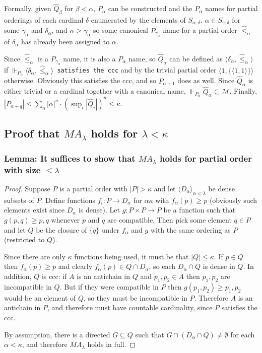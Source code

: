 \documentclass[12pt]{article}
\begin{document}
Formally, given $\hat{Q}_\beta$ for $\beta<\alpha$, $P_\alpha$ can be constructed and the $P_\alpha$ names for partial orderings of each cardinal $\delta$ enumerated by the elements of $S_{\alpha,\delta}$.  $\alpha\in S_{\gamma,\delta}$ for some $\gamma_\alpha$ and $\delta_\alpha$, and $\alpha\geq\gamma_\alpha$ so some canonical $P_{\gamma_\alpha}$ name for a partial order $\hat{\leq}_\alpha$ of $\delta_\alpha$ has already been assigned to $\alpha$.

Since $\hat{\leq}_\alpha$ is a $P_{\gamma_\alpha}$ name, it is also a $P_\alpha$ name, so $\hat{Q}_\alpha$ can be defined as $\langle\delta_\alpha,\hat{\leq}_\alpha\rangle$ if $\Vdash_{P_\alpha} \langle \delta_\alpha,\hat{\leq}_\alpha\rangle$\texttt{ satisfies the ccc} and by the trivial partial order $\langle 1,\{\langle 1,1\rangle\}\rangle$ otherwise.  Obviously this satisfies the ccc, and so $P_{\alpha+1}$ does as well.  Since $\hat{Q}_\alpha$ is either trivial or a cardinal together with a canonical name, $\Vdash_{P_\alpha}\hat{Q}_\alpha\subseteq\mathcal{M}$.  Finally, $|P_{\alpha+q}|\leq\sum_n|\alpha|^n\cdot(\operatorname{sup}_i|\hat{Q}_i|)^n\leq\kappa$.

\subsection*{Proof that $MA_\lambda$ holds for $\lambda<\kappa$}

\subsubsection*{Lemma: It suffices to show that $MA_\lambda$ holds for partial order with size $\leq\lambda$}
\begin{proof}
Suppose $P$ is a partial order with $|P|>\kappa$ and let $\langle D_\alpha\rangle_{\alpha<\lambda}$ be dense subsets of $P$.  Define functions $f_i:P\rightarrow D_\alpha$ for $\alpha\kappa$ with $f_\alpha(p)\geq p$ (obviously such elements exist since $D_\alpha$ is dense).  Let $g:P\times P\rightarrow P$ be a function such that $g(p,q)\geq p,q$ whenever $p$ and $q$ are compatible.  Then pick some element $q\in P$ and let $Q$ be the closure of $\{q\}$ under $f_\alpha$ and $g$ with the same ordering as $P$ (restricted to $Q$).

Since there are only $\kappa$ functions being used, it must be that $|Q|\leq\kappa$.  If $p\in Q$ then $f_\alpha(p)\geq p$ and clearly $f_\alpha(p)\in Q\cap D_\alpha$, so each $D_\alpha\cap Q$ is dense in $Q$.  In addition, $Q$ is ccc: if $A$ is an antichain in $Q$ and $p_1,p_2\in A$ then $p_1,p_2$ are incompatible in $Q$.  But if they were compatible in $P$ then $g(p_1,p_2)\geq p_1,p_2$ would be an element of $Q$, so they must be incompatible in $P$.  Therefore $A$ is an antichain in $P$, and therefore must have countable cardinality, since $P$ satisfies the ccc.

By assumption, there is a directed $G\subseteq Q$ such that $G\cap (D_\alpha\cap Q)\neq\emptyset$ for each $\alpha<\kappa$, and therefore $MA_\lambda$ holds in full.
\end{proof}
\end{document}

